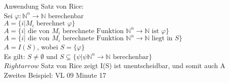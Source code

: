 \documentclass{article}
\begin{document}
Anwendung Satz von Rice: \\
Sei $\varphi : \mathbb{N}^n \rightarrow \mathbb{N}$ berechenbar \\
$A = \{ i | M_i \text{ berechnet } \varphi\}$ \\
$A = \{ i | \text{ die von $M_i$ berechnete Funktion } \mathbb{N}^n
\rightarrow \mathbb{N} \text{ ist } \varphi\}$ \\
$A = \{ i | \text{ die von $M_i$ berechnete Funktion } \mathbb{N}^n
\rightarrow \mathbb{N} \text{ liegt in } S \}$ \\
$A = I(S)$, wobei $S = \{ \varphi \}$ \\
Es gilt: $S \neq \emptyset$ und $S \subsetneq \{ \psi | \psi 
\mathbb{N}^n \rightarrow \mathbb{N} \text{ berechenbar} \}$ \\
$Rightarrow$ Satz von Rice zeigt I(S) ist unentscheidbar, und somit auch A \\

Zweites Beispiel: VL 09 Minute 17
\end{document}
